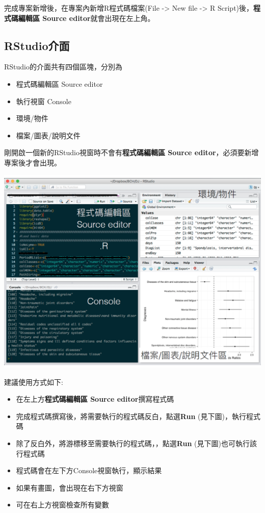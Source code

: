 \documentclass[]{book}
\providecommand{\tightlist}{%
  \setlength{\itemsep}{0pt}\setlength{\parskip}{0pt}}
\theoremstyle{definition}
\theoremstyle{definition}
\theoremstyle{remark}
\begin{document}
完成專案新增後，在專案內新增R程式碼檔案(File -\textgreater{} New file
-\textgreater{} R Script)後，\textbf{程式碼編輯區 Source
editor}就會出現在左上角。

\subsection{RStudio介面}\label{rstudio}

RStudio的介面共有四個區塊，分別為

\begin{itemize}
\tightlist
\item
  程式碼編輯區 Source editor
\item
  執行視窗 Console
\item
  環境/物件
\item
  檔案/圖表/說明文件
\end{itemize}

剛開啟一個新的RStudio視窗時不會有\textbf{程式碼編輯區 Source
editor}，必須要新增專案後才會出現。

\includegraphics[width=17.6in]{figure/RStudio}

建議使用方式如下:

\begin{itemize}
\tightlist
\item
  在左上方\textbf{程式碼編輯區 Source editor}撰寫程式碼
\item
  完成程式碼撰寫後，將需要執行的程式碼反白，點選\textbf{Run}
  (見下圖)，執行程式碼
\item
  除了反白外，將游標移至需要執行的程式碼，，點選\textbf{Run}
  (見下圖)也可執行該行程式碼
\item
  程式碼會在左下方Console視窗執行，顯示結果
\item
  如果有畫圖，會出現在右下方視窗
\item
  可在右上方視窗檢查所有變數
\end{itemize}
\end{document}
